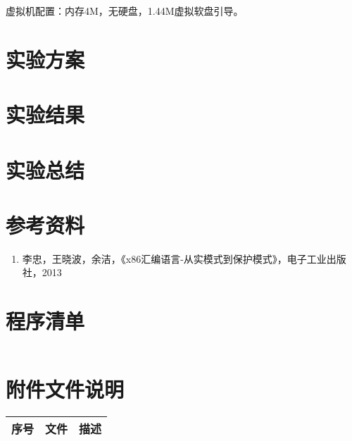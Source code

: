 \documentclass[logo,reportComp]{thesis}
\begin{document}
虚拟机配置：内存4M，无硬盘，1.44M虚拟软盘引导。

\section{实验方案}


\section{实验结果}


\section{实验总结}



\section{参考资料}
\begin{enumerate}
	\item 李忠，王晓波，余洁，《x86汇编语言-从实模式到保护模式》，电子工业出版社，2013
\end{enumerate}

\appendix
\appendixconfig
\section{程序清单}
\label{sec:code}

\begin{lstlisting}[language={[x86masm]Assembler}]

\end{lstlisting}

\section{附件文件说明}
\begin{center}
\begin{tabular}{|c|l|l|}\hline
序号 & 文件 & 描述 \\\hline
\end{tabular}
\end{center}
\end{document}
